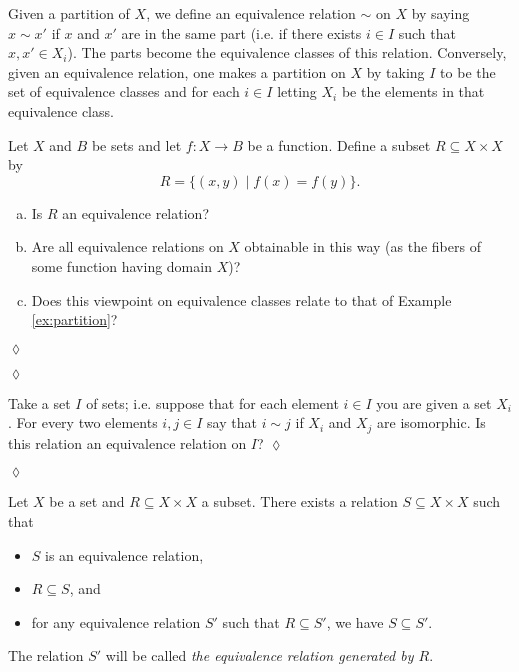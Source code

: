 \documentclass[a4paper]{book}
\def\to{\rightarrow}
\def\taking{\colon}
\def\ss{\subseteq}
\def\|{{\;|\;}}
\theoremstyle{myth}
\newtheorem{lemmaENG}[envENG]{\begin{english}Lemma\end{english}}
\newtheorem{exampleENG}[envENG]{\begin{english}Example\end{english}}
\newtheorem{excENG}[envENG]{\begin{english}Exercise\end{english}}
\newenvironment{exerciseENG}{\begin{excENG}}{\hspace*{\fill}$\lozenge$\end{excENG}}
\newtheorem{exampleRUS}[envRUS]{\begin{russian}Пример\end{russian}}
\newtheorem{excRUS}[envRUS]{\begin{russian}Упражнение\end{russian}}
\newenvironment{exerciseRUS}{\begin{excRUS}}{\hspace*{\fill}$\lozenge$\end{excRUS}}
\def\sexc{\begin{enumerate}[a.)]\setlength{\itemsep}{.1cm}\setlength{\parskip}{.1cm}\item}
\def\next{\item}
\def\endsexc{\end{enumerate}}
\begin{document}
\begin{english}
\begin{exampleENG}[Partitions]
Given a partition of $X$, we define an equivalence relation $\sim$ on $X$ by saying $x\sim x'$ if $x$ and $x'$ are in the same part (i.e. if there exists $i\in I$ such that $x,x'\in X_i$). The parts become the equivalence classes of this relation. Conversely, given an equivalence relation, one makes a partition on $X$ by taking $I$ to be the set of equivalence classes and for each $i\in I$ letting $X_i$ be the elements in that equivalence class.
\end{exampleENG}

\begin{exampleRUS}[Разбиения]\label{ex:partition}
\begin{russian} \end{russian}
\end{exampleRUS}

\begin{exerciseENG}
Let $X$ and $B$ be sets and let $f\taking X\to B$ be a function. Define a subset $R\ss X\times X$ by $$R=\{(x,y)\|f(x)=f(y)\}.$$ 
\sexc Is $R$ an equivalence relation? 
\next Are all equivalence relations on $X$ obtainable in this way (as the fibers of some function having domain $X$)?
\next Does this viewpoint on equivalence classes relate to that of Example \ref{ex:partition}?
\endsexc
\end{exerciseENG}

\begin{exerciseRUS}
\begin{russian} \end{russian}
\end{exerciseRUS}

\begin{exerciseENG}
Take a set $I$ of sets; i.e. suppose that for each element $i\in I$ you are given a set $X_i$. For every two elements $i,j\in I$ say that $i\sim j$ if $X_i$ and $X_j$ are isomorphic. Is this relation an equivalence relation on $I$?  
\end{exerciseENG}

\begin{exerciseRUS}
\begin{russian} \end{russian}
\end{exerciseRUS}

\begin{lemmaENG}\label{lemma:generating ERs}
Let $X$ be a set and $R\ss X\times X$ a subset. There exists a relation $S\ss X\times X$ such that
\begin{itemize}
\item $S$ is an equivalence relation,
\item $R\ss S$, and
\item for any equivalence relation $S'$ such that $R\ss S'$, we have $S\ss S'$.
\end{itemize}
The relation $S'$ will be called {\em the equivalence relation generated by $R$}.
\end{lemmaENG}


\end{english}
\end{document}
